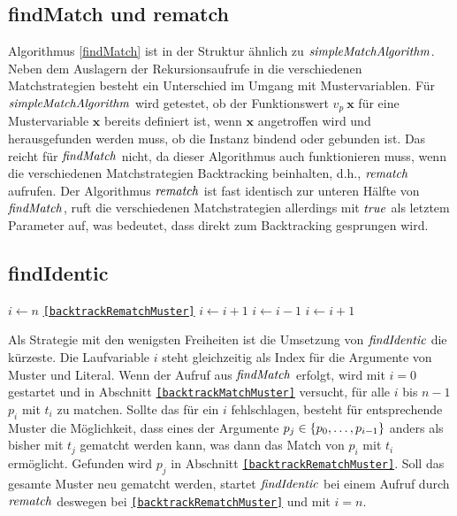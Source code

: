\subsection{findMatch und rematch}
Algorithmus \ref{findMatch} ist in der Struktur ähnlich zu $\mathit{simpleMatchAlgorithm}$. Neben dem Auslagern der Rekursionsaufrufe in die verschiedenen Matchstrategien besteht ein Unterschied im Umgang mit Mustervariablen. Für $\mathit{simpleMatchAlgorithm}$ wird getestet, ob der Funktionswert $v_p~\mathbf x$ für eine Mustervariable $\mathbf x$ bereits definiert ist, wenn $\mathbf x$ angetroffen wird und herausgefunden werden muss, ob die Instanz bindend oder gebunden ist. Das reicht für $\mathit{findMatch}$ nicht, da dieser Algorithmus auch funktionieren muss, wenn die verschiedenen Matchstrategien Backtracking beinhalten, d.h., $\mathit{rematch}$ aufrufen.
Der Algorithmus $\mathit{rematch}$ ist fast identisch zur unteren Hälfte von $\mathit{findMatch}$, ruft die verschiedenen Matchstrategien allerdings mit $\mathit{true}$ als letztem Parameter auf, was bedeutet, dass direkt zum Backtracking gesprungen wird.



\subsection {findIdentic}
\begin{algorithm}
\DontPrintSemicolon
\caption{$\Const{findIdentic} \colon M \times T \times \mathit{Bool} \rightarrow \mathit{Bool}$}\label{findIdentic}
\;
 {
	$i \leftarrow n$\;
	\Goto \texttt{\ref{backtrackRematchMuster}}\;
}
\Loop {} {
	 \label{backtrackMatchMuster}
	 {
		$i \leftarrow i + 1$\;
		 {}    
	}
	 \label{backtrackRematchMuster}
	 { 
		 {}
		$i \leftarrow i - 1$\;
	}    
	$i \leftarrow i + 1$\;
}
\end{algorithm}


Als Strategie mit den wenigsten Freiheiten ist die Umsetzung von $\mathit{findIdentic}$ die kürzeste. Die Laufvariable $i$ steht gleichzeitig als Index für die Argumente von Muster und Literal. Wenn der Aufruf aus $\mathit{findMatch}$ erfolgt, wird mit $i = 0$ gestartet und in Abschnitt \texttt{\ref{backtrackMatchMuster}} versucht, für alle $i$ bis $n-1$ $p_i$ mit $t_i$ zu matchen. Sollte das  für ein $i$ fehlschlagen, besteht für entsprechende Muster die Möglichkeit, dass eines der Argumente $p_j \in \{{p}_{0}, \dots, {p}_{i-1}\}$ anders als bisher mit $t_j$ gematcht werden kann, was dann das Match von $p_i$ mit $t_i$ ermöglicht. Gefunden wird $p_j$ in Abschnitt \texttt{\ref{backtrackRematchMuster}}. 
Soll das gesamte Muster neu gematcht werden, startet $\mathit{findIdentic}$ bei einem Aufruf durch $\mathit{rematch}$ deswegen bei \texttt{\ref{backtrackRematchMuster}} und mit $i = n$.

